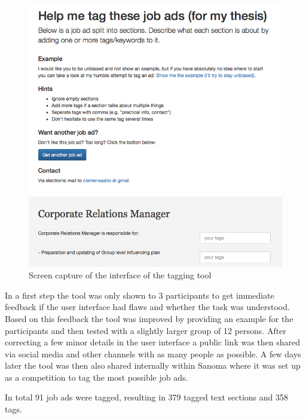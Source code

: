 \begin{figure}[h]
  \centering
  \includegraphics[width=\textwidth]{img/thesis-tagger-interface.png}
  \caption{Screen capture of the interface of the tagging tool}
\label{fig:thesis-tagger-interface}
\end{figure}

In a first step the tool was only shown to 3 participants to get immediate feedback if the user interface had flaws and whether the task was understood.   Based on this feedback the tool was improved by providing an example for the participants and then tested with a slightly larger group of 12 persons. After correcting a few minor details in the user interface a public link was then shared via social media and other channels with as many people as possible. A few days later the tool was then also shared internally within Sanoma where it was set up as a competition to tag the most possible job ads.

In total 91 job ads were tagged, resulting in 379 tagged text sections and 358 tags.


